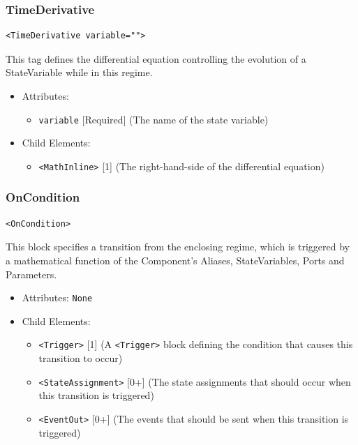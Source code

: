 \documentclass{article}
\begin{document}
\subsubsection{TimeDerivative}
%
\begin{lstlisting}
<TimeDerivative variable="">
\end{lstlisting}

This tag defines the differential equation controlling the evolution of a StateVariable while
in this regime.

\begin{itemize}
\item Attributes:
%
\begin{itemize}
\item \verb|variable| {[}Required{]} (The name of the state variable)
\end{itemize}

\item Child Elements:
%
\begin{itemize}
\item \verb|<MathInline>| {[}1{]} (The right-hand-side of the differential equation)
\end{itemize}
\end{itemize}



\subsubsection{OnCondition}
%
\begin{lstlisting}
<OnCondition>
\end{lstlisting}

This block specifies a transition from the enclosing regime, which is triggered
by a mathematical function of the Component's Aliases, StateVariables, Ports and
Parameters.

\begin{itemize}
\item Attributes: \texttt{None}

\item Child Elements:
%
\begin{itemize}
\item \verb|<Trigger>| {[}1{]} (A \verb|<Trigger>| block defining the condition that causes this transition to occur)
\item \verb|<StateAssignment>| {[}0+{]} (The state assignments that should occur when this
transition is triggered)
\item \verb|<EventOut>| {[}0+{]} (The events that should be sent when this transition is triggered)
\end{itemize}
\end{itemize}
\end{document}
